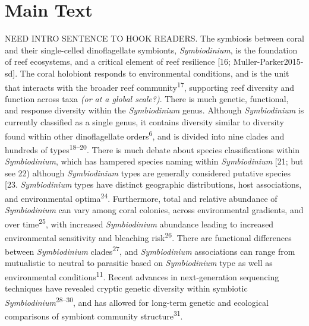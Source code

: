 \documentclass[]{article}
\begin{document}
\pagebreak

\section*{Main Text}\label{main-text}

NEED INTRO SENTENCE TO HOOK READERS. The symbiosis between coral and
their single-celled dinoflagellate symbionts, \emph{Symbiodinium}, is
the foundation of reef ecosystems, and a critical element of reef
resilience {[}16; Muller-Parker2015-sd{]}. The coral holobiont responds
to environmental conditions, and is the unit that interacts with the
broader reef community\textsuperscript{17}, supporting reef diversity
and function across taxa \emph{(or at a global scale?)}. There is much
genetic, functional, and response diversity within the
\emph{Symbiodinium} genus. Although \emph{Symbiodinium} is currently
classified as a single genus, it contains diversity similar to diversity
found within other dinoflagellate orders\textsuperscript{6}, and is
divided into nine clades and hundreds of types\textsuperscript{18--20}.
There is much debate about species classifications within
\emph{Symbiodinium}, which has hampered species naming within
\emph{Symbiodinium} {[}21; but see 22) although \emph{Symbiodinium}
types are generally considered putative species {[}23.
\emph{Symbiodinium} types have distinct geographic distributions, host
associations, and environmental optima\textsuperscript{24}. Furthermore,
total and relative abundance of \emph{Symbiodinium} can vary among coral
colonies, across environmental gradients, and over
time\textsuperscript{25}, with increased \emph{Symbiodinium} abundance
leading to increased environmental sensitivity and bleaching
risk\textsuperscript{26}. There are functional differences between
\emph{Symbiodinium} clades\textsuperscript{27}, and \emph{Symbiodinium}
associations can range from mutualistic to neutral to parasitic based on
\emph{Symbiodinium} type as well as environmental
conditions\textsuperscript{11}. Recent advances in next-generation
sequencing techniques have revealed cryptic genetic diversity within
symbiotic \emph{Symbiodinium}\textsuperscript{28--30}, and has allowed
for long-term genetic and ecological comparisons of symbiont community
structure\textsuperscript{31}.
\end{document}

